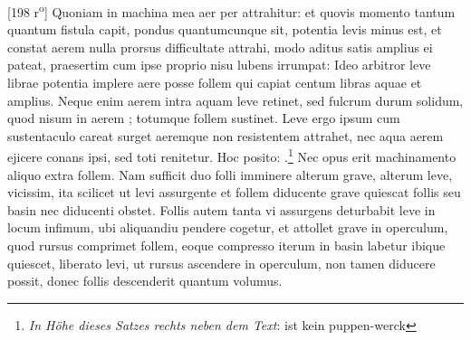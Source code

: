         \vspace*{8mm}
        \pstart 
        \normalsize
      [198 r\textsuperscript{o}] Quoniam in machina mea aer per  attrahitur: et quovis momento tantum  quantum fistula capit,   pondus quantumcunque sit, potentia  levis minus est, et constat aerem nulla prorsus difficultate attrahi, modo aditus satis amplius ei pateat, praesertim cum ipse proprio nisu lubens irrumpat: Ideo arbitror leve  librae potentia implere aere posse follem qui capiat centum libras aquae et amplius. Neque enim aerem intra aquam leve retinet, sed fulcrum durum solidum, quod  nisum in aerem ; totumque follem sustinet. Leve ergo ipsum cum sustentaculo careat surget aeremque non resistentem attrahet, nec aqua aerem ejicere conans ipsi, sed toti renitetur. Hoc posito: .\footnote{\textit{In H\"{o}he dieses Satzes rechts neben dem Text}: ist kein puppen-werck} Nec opus erit machinamento aliquo extra follem. Nam sufficit duo folli imminere alterum grave, alterum leve,  vicissim, ita scilicet ut levi assurgente et follem diducente grave quiescat  follis seu basin nec diducenti obstet. Follis autem tanta vi assurgens deturbabit leve in locum infimum, ubi aliquandiu pendere cogetur, et attollet grave in operculum, quod rursus comprimet follem, eoque compresso iterum in basin labetur ibique quiescet, liberato levi, ut rursus ascendere in operculum, non tamen diducere possit, donec  follis descenderit quantum volumus. \pend
